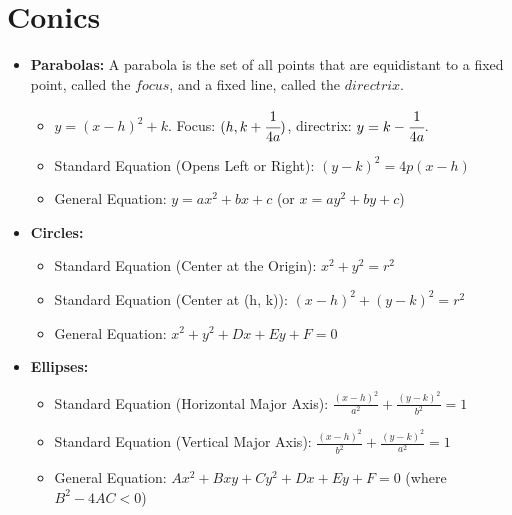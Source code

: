 \documentclass[letterpaper,12pt]{article}
\begin{document}
\section{Conics}
\begin{itemize}
    \item \textbf{Parabolas:}
    A parabola is the set of all points that are equidistant to a fixed point, called the $focus$, and a fixed line, called the $directrix$.

        \begin{itemize}
        \item $y=(x - h)^2 +k$. Focus: $(h,k+\cfrac{1}{4a})$, directrix: $y=k-\cfrac{1}{4a}$.
        \item Standard Equation (Opens Left or Right): $(y - k)^2 = 4p(x - h)$
        \item General Equation: $y = ax^2 + bx + c$ (or $x = ay^2 + by + c$)
        \end{itemize}

    \item \textbf{Circles:}
        \begin{itemize}
        \item Standard Equation (Center at the Origin):  $x^2 + y^2 = r^2$
        \item Standard Equation (Center at (h, k)): $(x - h)^2 + (y - k)^2 = r^2$
        \item General Equation: $x^2 + y^2 + Dx + Ey + F = 0$
        \end{itemize}
    \item \textbf{Ellipses:}
        \begin{itemize}
        \item Standard Equation (Horizontal Major Axis): $\frac{(x - h)^2}{a^2} + \frac{(y - k)^2}{b^2} = 1$
        \item Standard Equation (Vertical Major Axis): $\frac{(x - h)^2}{b^2} + \frac{(y - k)^2}{a^2} = 1$
        \item General Equation: $Ax^2 + Bxy + Cy^2 + Dx + Ey + F = 0$ (where $B^2 - 4AC < 0$)
        \end{itemize}
    

\end{itemize}
\end{document}
